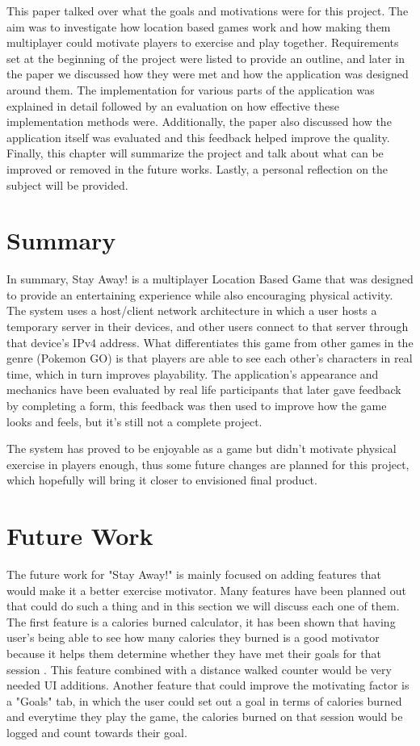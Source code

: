 \documentclass{dissertation}
\begin{document}
This paper talked over what the goals and motivations were for this project. The aim was to investigate how location based games work and how making them multiplayer could motivate players to exercise and play together. Requirements set at the beginning of the project were listed to provide an outline, and later in the paper we discussed how they were met and how the application was designed around them. The implementation for various parts of the application was explained in detail followed by an evaluation on how effective these implementation methods were. Additionally, the paper also discussed how the application itself was evaluated and this feedback helped improve the quality. Finally, this chapter will summarize the project and talk about what can be improved or removed in the future works. Lastly, a personal reflection on the subject will be provided.

\section{Summary}

In summary, Stay Away! is a multiplayer Location Based Game that was designed to provide an entertaining experience while also encouraging physical activity. The system uses a host/client network architecture in which a user hosts a temporary server in their devices, and other users connect to that server through that device's IPv4 address. What differentiates this game from other games in the genre (Pokemon GO) is that players are able to see each other's characters in real time, which in turn improves playability. The application's appearance and mechanics have been evaluated by real life participants that later gave feedback by completing a form, this feedback was then used to improve how the game looks and feels, but it's still not a complete project.

The system has proved to be enjoyable as a game but didn't motivate physical exercise in players enough, thus some future changes are planned for this project, which hopefully will bring it closer to envisioned final product.

\section{Future Work}

The future work for "Stay Away!" is mainly focused on adding features that would make it a better exercise motivator. Many features have been planned out that could do such a thing and in this section we will discuss each one of them. The first feature is a calories burned calculator, it has been shown that having user's being able to see how many calories they burned is a good motivator because it helps them determine whether they have met their goals for that session \citep{Sullivan16}. This feature combined with a distance walked counter would be very needed UI additions. Another feature that could improve the motivating factor is a "Goals" tab, in which the user could set out a goal in terms of calories burned and everytime they play the game, the calories burned on that session would be logged and count towards their goal. 
\end{document}
